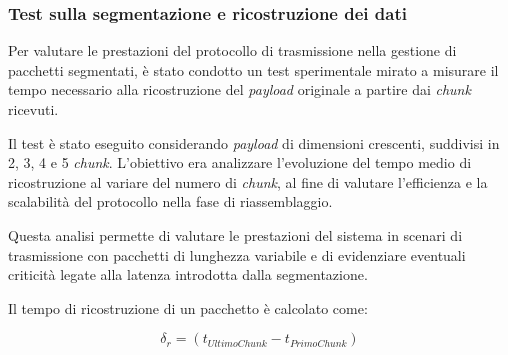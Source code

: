 \documentclass[12pt,a4paper,twoside]{book}
\begin{document}
\newpage
\subsubsection{Test sulla segmentazione e ricostruzione dei dati}
\begin{table}[H]
    \centering
    \caption{Condizioni del test di segmentazione e ricostruzione dei dati.}
    \label{tab:T2-conditions}
\end{table}

Per valutare le prestazioni del protocollo di trasmissione nella gestione di pacchetti segmentati,
è stato condotto un test sperimentale mirato a misurare il tempo necessario alla ricostruzione
del \emph{payload} originale a partire dai \emph{chunk} ricevuti.

Il test è stato eseguito considerando \emph{payload} di dimensioni crescenti, suddivisi in 2, 3, 4 e 5
\emph{chunk}.
L’obiettivo era analizzare l’evoluzione del tempo medio di ricostruzione al variare del numero di
\emph{chunk}, al fine di valutare l’efficienza e la scalabilità del protocollo nella fase di riassemblaggio.

Questa analisi permette di valutare le prestazioni del sistema in scenari di trasmissione con pacchetti
di lunghezza variabile e di evidenziare eventuali criticità legate alla latenza introdotta dalla segmentazione.

Il tempo di ricostruzione di un pacchetto è calcolato come:

\begin{equation}
    \delta_{r} = (t_{UltimoChunk} - t_{PrimoChunk})
    \label{formula:reconstruction-time}
\end{equation}
\end{document}
